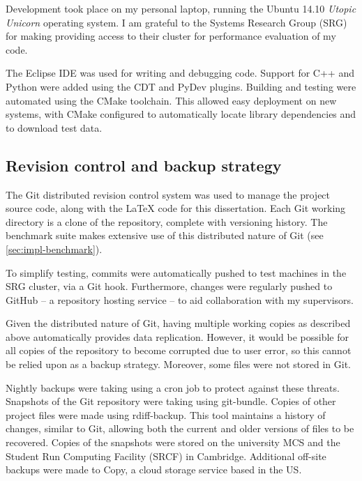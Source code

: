 Development took place on my personal laptop, running the Ubuntu 14.10 \textit{Utopic Unicorn} operating system. I am grateful to the Systems Research Group (SRG) for making providing access to their cluster for performance evaluation of my code.

The Eclipse IDE was used for writing and debugging code. Support for C++ and Python were added using the CDT and PyDev plugins. Building and testing were automated using the CMake toolchain. This allowed easy deployment on new systems, with CMake configured to automatically locate library dependencies and to download test data.

\subsection{Revision control and backup strategy}



The Git distributed revision control system was used to manage the project source code, along with the {\LaTeX} code for this dissertation. Each Git working directory is a clone of the repository, complete with versioning history. The benchmark suite makes extensive use of this distributed nature of Git (see \cref{sec:impl-benchmark}).


To simplify testing, commits were automatically pushed to test machines in the SRG cluster, via a Git hook. Furthermore, changes were regularly pushed to GitHub -- a repository hosting service -- to aid collaboration with my supervisors. 

Given the distributed nature of Git, having multiple working copies as described above automatically provides data replication. However, it would be possible for all copies of the repository to become corrupted due to user error, so this cannot be relied upon as a backup strategy. Moreover, some files were not stored in Git\footnotemark.

Nightly backups were taking using a cron job to protect against these threats. Snapshots of the Git repository were taking using git-bundle. Copies of other project files were made using rdiff-backup. This tool maintains a history of changes, similar to Git, allowing both the current and older versions of files to be recovered. Copies of the snapshots were stored on the university MCS and the Student Run Computing Facility (SRCF) in Cambridge. Additional off-site backups were made to Copy, a cloud storage service based in the US.


%
